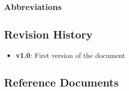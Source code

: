 \subsubsection{\sffamily Abbreviations}


\subsection{\sffamily Revision History}
\begin{itemize}
	\item
	\textbf{v1.0}: First version of the document
\end{itemize}


\subsection{\sffamily Reference Documents}

